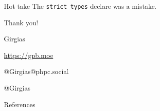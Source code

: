 \documentclass[aspectratio=169]{beamer}
\begin{document}
\begin{frame}{Hot take}
    The \texttt{strict\_types} declare was a \alert{mistake}.
\end{frame}

{
\begin{frame}[standout]
    Thank you!
    \begin{description}[Mastodon:]
        \item[GitHub:] Girgias
        \item[Site:] \url{https://gpb.moe}
        \item[Mastodon:] @Girgias@phpc.social
        \item[Twitter:] @Girgias
    \end{description}
\end{frame}
}
\appendix

\begin{frame}[allowframebreaks]{References}
  \printbibliography
\end{frame}
\end{document}
